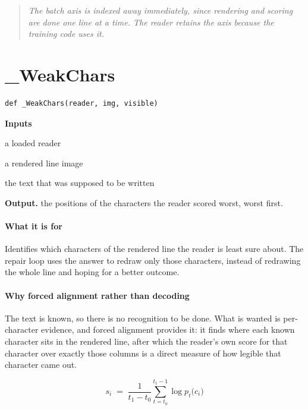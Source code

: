\begin{quote}\small\itshape The batch axis is indexed away immediately, since rendering and scoring are done one line at a time. The reader retains the axis because the training code uses it.\end{quote}

\section{\_WeakChars}
\begin{lstlisting}[style=sig]
def _WeakChars(reader, img, visible)
\end{lstlisting}

\noindent\textbf{Inputs}
\begin{description}[leftmargin=2.2em,style=nextline,font=\normalfont\ttfamily]\setlength\itemsep{1pt}
  \item[{reader}] \normalfont a loaded reader
  \item[{img}] \normalfont a rendered line image
  \item[{visible}] \normalfont the text that was supposed to be written
\end{description}

\noindent\textbf{Output.} the positions of the characters the reader scored worst, worst first.


\paragraph{What it is for}
Identifies which characters of the rendered line the reader is least sure about. The repair loop uses the answer to redraw only those characters, instead of redrawing the whole line and hoping for a better outcome.


\paragraph{Why forced alignment rather than decoding}
The text is known, so there is no recognition to be done. What is wanted is per-character evidence, and forced alignment provides it: it finds where each known character sits in the rendered line, after which the reader's own score for that character over exactly those columns is a direct measure of how legible that character came out.


\begin{equation}
s_i \;=\; \frac{1}{t_1 - t_0} \sum_{t=t_0}^{t_1-1} \log p_t\big(c_i\big)
\end{equation}

